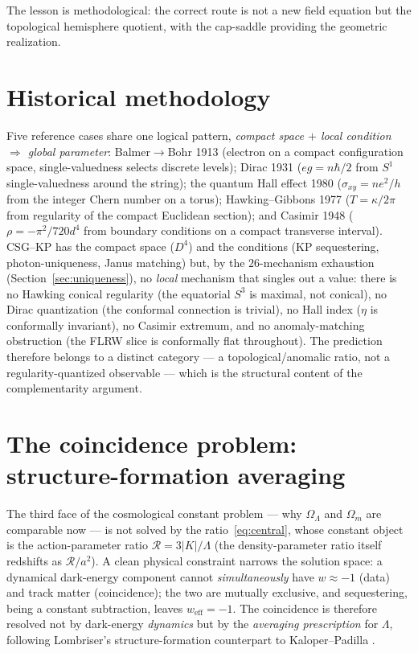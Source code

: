 \documentclass[11pt,a4paper]{article}
\theoremstyle{plain}
\theoremstyle{definition}
\theoremstyle{remark}
\newcommand{\OL}{\Omega_\Lambda}
\newcommand{\Om}{\Omega_m}
\begin{document}
The lesson is methodological: the correct route is not a new field equation but the topological
hemisphere quotient, with the cap-saddle providing the geometric realization.

\section{Historical methodology}
\label{sec:history}
Five reference cases share one logical pattern, \emph{compact space $+$ local condition
$\Rightarrow$ global parameter}: Balmer$\to$Bohr 1913 (electron on a compact configuration space,
single-valuedness selects discrete levels); Dirac 1931 ($eg = n\hbar/2$ from $S^1$
single-valuedness around the string); the quantum Hall effect 1980 ($\sigma_{xy} = ne^2/h$ from
the integer Chern number on a torus); Hawking--Gibbons 1977 ($T = \kappa/2\pi$ from regularity of
the compact Euclidean section); and Casimir 1948 ($\rho = -\pi^2/720d^4$ from boundary conditions
on a compact transverse interval). CSG--KP has the compact space ($D^4$) and the conditions (KP
sequestering, photon-uniqueness, Janus matching) but, by the $26$-mechanism exhaustion
(Section~\ref{sec:uniqueness}), no \emph{local} mechanism that singles out a value: there is no
Hawking conical regularity (the equatorial $S^3$ is maximal, not conical), no Dirac quantization
(the conformal connection is trivial), no Hall index ($\eta$ is conformally invariant), no
Casimir extremum, and no anomaly-matching obstruction (the FLRW slice is conformally flat
throughout). The prediction therefore belongs to a distinct category --- a topological/anomalic
ratio, not a regularity-quantized observable --- which is the structural content of the
complementarity argument.

\section{The coincidence problem: structure-formation averaging}
\label{sec:coincidence}

The third face of the cosmological constant problem --- why $\OL$ and $\Om$ are comparable now
--- is not solved by the ratio~\eqref{eq:central}, whose constant object is the action-parameter
ratio $\mathcal{R}=3|K|/\Lambda$ (the density-parameter ratio itself redshifts as $\mathcal{R}/a^2$).
A clean
physical constraint narrows the solution space: a dynamical dark-energy component cannot
\emph{simultaneously} have $w \approx -1$ (data) and track matter (coincidence); the two are
mutually exclusive, and sequestering, being a constant subtraction, leaves $w_{\mathrm{eff}} =
-1$. The coincidence is therefore resolved not by dark-energy \emph{dynamics} but by the
\emph{averaging prescription} for $\Lambda$, following Lombriser's structure-formation
counterpart to Kaloper--Padilla \cite{Lombriser2019}.
\end{document}
